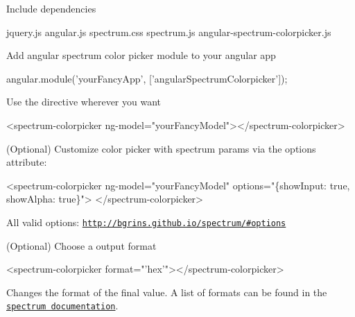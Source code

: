 \begin{DoxyEnumerate}
\item Include dependencies \begin{DoxyVerb} jquery.js
 angular.js
 spectrum.css
 spectrum.js
 angular-spectrum-colorpicker.js
\end{DoxyVerb}

\item Add angular spectrum color picker module to your angular app 
\begin{DoxyCode}
angular.module('yourFancyApp', ['angularSpectrumColorpicker']);
\end{DoxyCode}

\item Use the directive wherever you want 
\begin{DoxyCode}
<spectrum-colorpicker ng-model="yourFancyModel"></spectrum-colorpicker>
\end{DoxyCode}

\begin{DoxyItemize}
\item (Optional) Customize color picker with spectrum params via the options attribute\+: 
\begin{DoxyCode}
<spectrum-colorpicker
  ng-model="yourFancyModel"
  options="\{showInput: true, showAlpha: true\}">
</spectrum-colorpicker>
\end{DoxyCode}
 All valid options\+: \href{http://bgrins.github.io/spectrum/#options}{\tt http\+://bgrins.\+github.\+io/spectrum/\#options}
\item (Optional) Choose a output format 
\begin{DoxyCode}
<spectrum-colorpicker format="'hex'"></spectrum-colorpicker>
\end{DoxyCode}
 Changes the format of the final value. A list of formats can be found in the \href{http://bgrins.github.io/spectrum/#details-acceptedColorInputs}{\tt spectrum documentation}.
\end{DoxyItemize}
\end{DoxyEnumerate}
